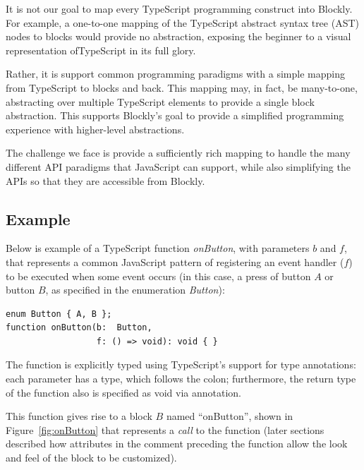 It is not our goal to map every TypeScript programming construct into Blockly.
For example, a one-to-one mapping of the TypeScript abstract syntax tree (AST) 
nodes to blocks would provide no abstraction, exposing the beginner to a visual 
representation ofTypeScript in its full glory.

Rather, it is support common programming paradigms with a simple mapping
from TypeScript to blocks and back.  This mapping may, in fact, be many-to-one, 
abstracting over multiple TypeScript elements to provide a single block abstraction.
This supports Blockly's goal to provide a simplified programming experience 
with higher-level abstractions. 

The challenge we face is provide a sufficiently rich mapping to handle the
many different API paradigms that JavaScript can support, while
also simplifying the APIs so that they are accessible from Blockly. 

\subsection{Example}

Below is example of a TypeScript function \emph{onButton},
with parameters $b$ and $f$,
that represents a common JavaScript pattern of registering an event
handler ($f$) to be executed when some event occurs (in this case, 
a press of button $A$ or button $B$, as specified in the enumeration
\emph{Button}):
\begin{lstlisting}
enum Button { A, B };
function onButton(b:  Button, 
                  f: () => void): void { }
\end{lstlisting}
The function is explicitly typed using TypeScript's support for
type annotations: each parameter has a type, which follows the colon;
furthermore, the return type of the function also is specified as void
via annotation. 

This function gives rise to a 
block $B$ named ``onButton'', shown in Figure~\ref{fig:onButton}
that represents a \emph{call} to the function
(later sections described how attributes in the comment preceding
the function allow the look and feel of the block to be customized).

